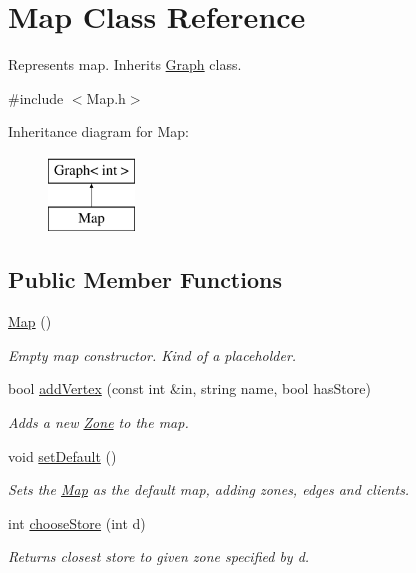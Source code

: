 \hypertarget{classMap}{\section{Map Class Reference}
\label{classMap}
}


Represents map. Inherits \hyperlink{classGraph}{Graph} class.  




{\ttfamily \#include $<$Map.\-h$>$}

Inheritance diagram for Map\-:\begin{figure}[H]
\begin{center}
\leavevmode
\includegraphics[height=2.000000cm]{classMap}
\end{center}
\end{figure}
\subsection*{Public Member Functions}
\begin{DoxyCompactItemize}
\item 
\hypertarget{classMap_a0f5ad0fd4563497b4214038cbca8b582}{\hyperlink{classMap_a0f5ad0fd4563497b4214038cbca8b582}{Map} ()}\label{classMap_a0f5ad0fd4563497b4214038cbca8b582}

\begin{DoxyCompactList}\small\item\em Empty map constructor. Kind of a placeholder. \end{DoxyCompactList}\item 
bool \hyperlink{classMap_af85ad221d75445dfb341aee1786a3e47}{add\-Vertex} (const int \&in, string name, bool has\-Store)
\begin{DoxyCompactList}\small\item\em Adds a new \hyperlink{classZone}{Zone} to the map. \end{DoxyCompactList}\item 
\hypertarget{classMap_abd12f966840ae67ba28106e13fc92067}{void \hyperlink{classMap_abd12f966840ae67ba28106e13fc92067}{set\-Default} ()}\label{classMap_abd12f966840ae67ba28106e13fc92067}

\begin{DoxyCompactList}\small\item\em Sets the \hyperlink{classMap}{Map} as the default map, adding zones, edges and clients. \end{DoxyCompactList}\item 
int \hyperlink{classMap_a4b728a284793fa3388fd425dcf2d8b09}{choose\-Store} (int d)
\begin{DoxyCompactList}\small\item\em Returns closest store to given zone specified by d. \end{DoxyCompactList}\end{DoxyCompactItemize}
